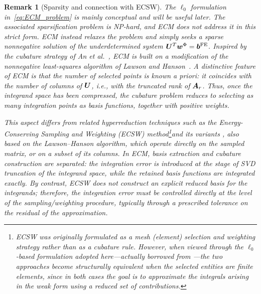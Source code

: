 \documentclass[11pt,a4paper]{article}
\newtheorem{remark}{Remark}
\begin{document}
\begin{remark}[Sparsity and connection with ECSW]
The $\ell_0$ formulation in~\eqref{eq:ECM_problem} is mainly conceptual and will
be useful later. The associated sparsification problem is NP-hard, and ECM does
not address it in this strict form. ECM instead relaxes the problem and simply seeks a
sparse nonnegative solution of the underdetermined system
$\bm{U}^T\bm{w}^{\Phi}=\bm{b}^{\mathrm{FE}}$.  Inspired by the cubature strategy of An et al.~\cite{an2009optimizing},
  ECM  is built on a modification of the nonnegative least-squares
algorithm of Lawson and Hanson~\cite{lawson1995solving}. A distinctive feature of ECM is that the number of selected points  is known
a priori:   it coincides with the number of columns of
$\bm{U}$, i.e., with the truncated rank of $\bm{A}_{r}$. Thus, once the integrand
space has been compressed, the cubature problem reduces to selecting as many
integration points as basis functions, together with positive weights.

This aspect differs from related hyperreduction techniques such as the
Energy-Conserving Sampling and Weighting (ECSW) method\footnote{ECSW was originally formulated as a mesh (element) selection and weighting
strategy rather than as a cubature rule. However, when viewed through the
$\ell_0$-based formulation adopted here---actually borrowed from
\cite{farhat2014dimensional}---the two approaches become structurally equivalent
when the selected entities are finite elements, since in both cases the goal is
to approximate the integrals arising in the weak form using a reduced set of
contributions.}and its variants
\cite{farhat2014dimensional,farhat2015structure}, also based on the
Lawson--Hanson algorithm, which operate directly on the sampled matrix, or on a
subset of its columns. In ECM, basis extraction and cubature construction are
separated: the integration error is introduced at the stage of SVD truncation of
the integrand space, while the retained basis functions are integrated exactly.
By contrast, ECSW does not construct an explicit reduced basis for the
integrands; therefore, the integration error must be controlled directly at the
level of the sampling/weighting procedure, typically through a prescribed
tolerance on the residual of the approximation.
\end{remark}

\end{document}
